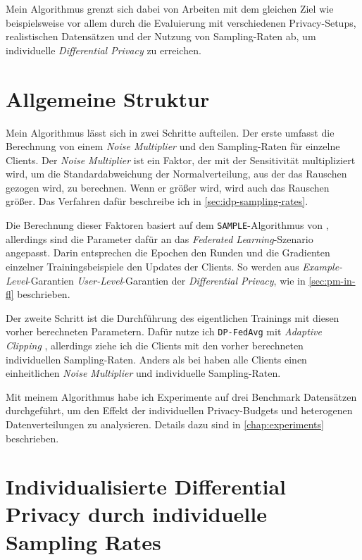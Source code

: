 Mein Algorithmus grenzt sich dabei von Arbeiten mit dem gleichen Ziel wie beispielsweise \textcite{aldaghri:2023} vor allem durch die Evaluierung mit verschiedenen Privacy-Setups, realistischen Datensätzen und der Nutzung von Sampling-Raten ab, um individuelle \textit{Differential Privacy} zu erreichen.

\section{Allgemeine Struktur}
Mein Algorithmus lässt sich in zwei Schritte aufteilen. Der erste umfasst die Berechnung von einem \textit{Noise Multiplier} und den Sampling-Raten für einzelne Clients. Der \textit{Noise Multiplier} ist ein Faktor, der mit der Sensitivität multipliziert wird, um die Standardabweichung der Normalverteilung, aus der das Rauschen gezogen wird, zu berechnen. Wenn er größer wird, wird auch das Rauschen größer. Das Verfahren dafür beschreibe ich in \autoref{sec:idp-sampling-rates}. 

Die Berechnung dieser Faktoren basiert auf dem \texttt{SAMPLE}-Algorithmus von \textcite{boenisch:2023}, allerdings sind die Parameter dafür an das \textit{Federated Learning}-Szenario angepasst. Darin entsprechen die Epochen den Runden und die Gradienten einzelner Trainingsbeispiele den Updates der Clients. So werden aus \textit{Example-Level}-Garantien \textit{User-Level}-Garantien der \textit{Differential Privacy}, wie in \autoref{sec:pm-in-fl} beschrieben.

Der zweite Schritt ist die Durchführung des eigentlichen Trainings mit diesen vorher berechneten Parametern. Dafür nutze ich \texttt{DP-FedAvg} mit \textit{Adaptive Clipping} \cite{andrew:2021}, allerdings ziehe ich die Clients mit den vorher berechneten individuellen Sampling-Raten. Anders als bei \citeauthor{aldaghri:2023} haben alle Clients einen einheitlichen \textit{Noise Multiplier} und individuelle Sampling-Raten.

Mit meinem Algorithmus habe ich Experimente auf drei Benchmark Datensätzen durchgeführt, um den Effekt der individuellen Privacy-Budgets und heterogenen Datenverteilungen zu analysieren. Details dazu sind in \autoref{chap:experiments} beschrieben.

\section{Individualisierte Differential Privacy durch individuelle Sampling Rates}\label{sec:idp-sampling-rates}

